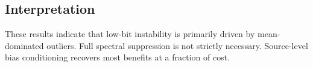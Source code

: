\begin{table}[h]
\caption{Downstream performance on GPT-2 1.1B across different precision settings, reported with task-specific metrics.}
\vspace{-0.7\baselineskip}
\centering
\small
{}
\label{table:downstream-task-averis}
\end{table}

\subsection{Interpretation}

These results indicate that
low-bit instability is primarily driven by mean-dominated outliers.
Full spectral suppression is not strictly necessary.
Source-level bias conditioning recovers most benefits at a fraction of cost.
